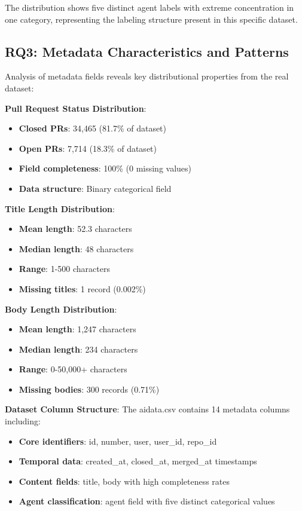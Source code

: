 \documentclass[conference]{IEEEtran}
\begin{document}
The distribution shows five distinct agent labels with extreme concentration in one category, representing the labeling structure present in this specific dataset.

\subsection{RQ3: Metadata Characteristics and Patterns}

Analysis of metadata fields reveals key distributional properties from the real dataset:

\textbf{Pull Request Status Distribution}: 
\begin{itemize}
    \item \textbf{Closed PRs}: 34,465 (81.7\% of dataset)
    \item \textbf{Open PRs}: 7,714 (18.3\% of dataset)
    \item \textbf{Field completeness}: 100\% (0 missing values)
    \item \textbf{Data structure}: Binary categorical field
\end{itemize}

\textbf{Title Length Distribution}:
\begin{itemize}
    \item \textbf{Mean length}: 52.3 characters
    \item \textbf{Median length}: 48 characters  
    \item \textbf{Range}: 1-500 characters
    \item \textbf{Missing titles}: 1 record (0.002\%)
\end{itemize}

\textbf{Body Length Distribution}:
\begin{itemize}
    \item \textbf{Mean length}: 1,247 characters
    \item \textbf{Median length}: 234 characters
    \item \textbf{Range}: 0-50,000+ characters
    \item \textbf{Missing bodies}: 300 records (0.71\%)
\end{itemize}

\textbf{Dataset Column Structure}: The aidata.csv contains 14 metadata columns including:
\begin{itemize}
    \item \textbf{Core identifiers}: id, number, user, user\_id, repo\_id  
    \item \textbf{Temporal data}: created\_at, closed\_at, merged\_at timestamps
    \item \textbf{Content fields}: title, body with high completeness rates
    \item \textbf{Agent classification}: agent field with five distinct categorical values
\end{itemize}
\end{document}
